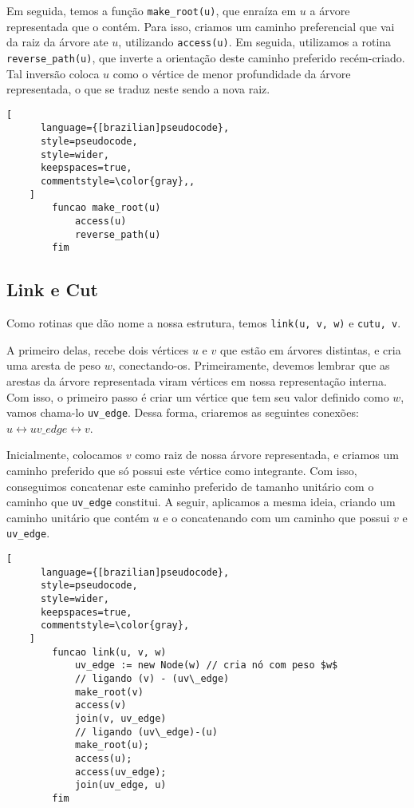 Em seguida, temos a função \texttt{make\_root(u)}, que enraíza em $u$ a árvore representada que o contém. Para isso, criamos um caminho preferencial que vai da raiz da árvore ate $u$, utilizando \texttt{access(u)}. Em seguida, utilizamos a rotina \texttt{reverse\_path(u)}, que inverte a orientação deste caminho preferido recém-criado. Tal inversão coloca $u$ como o vértice de menor profundidade da árvore representada, o que se traduz neste sendo a nova raiz.

\begin{programruledcaption}{\label{lct:make-root}}
    \begin{lstlisting}[
      language={[brazilian]pseudocode},
      style=pseudocode,
      style=wider,
      keepspaces=true,
      commentstyle=\color{gray},,
    ]
        funcao make_root(u)
            access(u)
            reverse_path(u)
        fim
    \end{lstlisting}
\end{programruledcaption}

\subsection{Link e Cut}
\label{subsection:lct-link-cut}

Como rotinas que dão nome a nossa estrutura, temos \texttt{link(u, v, w)} e \texttt{cut{u, v}}.

A primeiro delas, recebe dois vértices $u$ e $v$ que estão em árvores distintas, e cria uma aresta de peso $w$, conectando-os. Primeiramente, devemos lembrar que as arestas da árvore representada viram vértices em nossa representação interna. Com isso, o primeiro passo é criar um vértice que tem seu valor definido como $w$, vamos chama-lo \texttt{uv\_edge}. Dessa forma, criaremos as seguintes conexões: $u \leftrightarrow uv\_edge \leftrightarrow v$.

Inicialmente, colocamos $v$ como raiz de nossa árvore representada, e criamos um caminho preferido que só possui este vértice como integrante. Com isso, conseguimos concatenar este caminho preferido de tamanho unitário com o caminho que \texttt{uv\_edge} constitui. A seguir, aplicamos a mesma ideia, criando um caminho unitário que contém $u$ e o concatenando com um caminho que possui $v$ e \texttt{uv\_edge}.

\begin{programruledcaption}{\label{lct:link}}
    \begin{lstlisting}[
      language={[brazilian]pseudocode},
      style=pseudocode,
      style=wider,
      keepspaces=true,
      commentstyle=\color{gray},
    ]
        funcao link(u, v, w)
            uv_edge := new Node(w) // cria nó com peso $w$
            // ligando (v) - (uv\_edge)
            make_root(v)
            access(v)
            join(v, uv_edge)
            // ligando (uv\_edge)-(u)
            make_root(u);
            access(u);
            access(uv_edge);
            join(uv_edge, u)
        fim
    \end{lstlisting}
\end{programruledcaption}

